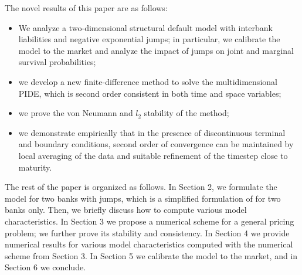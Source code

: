 The novel results of this paper are as follows:
\begin{itemize}
\item We analyze a two-dimensional structural default model with interbank liabilities and negative exponential jumps; in particular, we calibrate the model to the market and analyze the impact of jumps on joint and marginal survival probabilities; 
\item we develop a new finite-difference method to solve the multidimensional PIDE, which is second order consistent in both time and space variables; 
\item we prove the von Neumann and $l_2$ stability of the method; %
\item we demonstrate empirically that in the presence of discontinuous terminal and boundary conditions, second order of convergence can be maintained by local averaging of the data and suitable refinement of the timestep close to maturity.
\end{itemize}


The rest of the paper is organized as follows. In Section 2, we formulate the model for two banks with jumps, which is a simplified formulation of \cite{Lipton2015} for two banks only. Then, we briefly discuss how to compute various model characteristics. In Section 3 we propose a numerical scheme for a general pricing problem; we further prove its stability and consistency. In Section 4 we provide numerical results for various model characteristics computed with the numerical scheme from Section 3. In Section 5 we calibrate the model to the market, and in Section 6 we conclude.